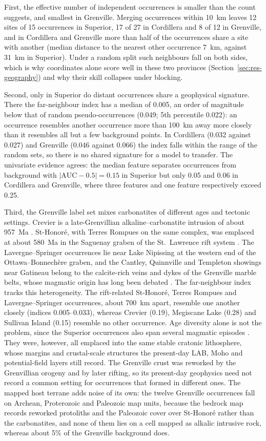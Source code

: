 \documentclass[pdflatex,sn-apa]{sn-jnl}
\begin{document}
First, the effective number of independent occurrences is smaller than the count suggests, and smallest in Grenville. Merging occurrences within 10~km leaves 12 sites of 15 occurrences in Superior, 17 of 27 in Cordillera and 8 of 12 in Grenville, and in Cordillera and Grenville more than half of the occurrences share a site with another (median distance to the nearest other occurrence 7~km, against 31~km in Superior). Under a random split such neighbours fall on both sides, which is why coordinates alone score well in these two provinces (Section~\ref{sec:res-geography}) and why their skill collapses under blocking.

Second, only in Superior do distant occurrences share a geophysical signature. There the far-neighbour index has a median of 0.005, an order of magnitude below that of random pseudo-occurrences (0.049; 5th percentile 0.022): an occurrence resembles another occurrence more than 100~km away more closely than it resembles all but a few background points. In Cordillera (0.032 against 0.027) and Grenville (0.046 against 0.066) the index falls within the range of the random sets, so there is no shared signature for a model to transfer. The univariate evidence agrees: the median feature separates occurrences from background with $|\mathrm{AUC}-0.5| = 0.15$ in Superior but only 0.05 and 0.06 in Cordillera and Grenville, where three features and one feature respectively exceed 0.25.

Third, the Grenville label set mixes carbonatites of different ages and tectonic settings. Crevier is a late-Grenvillian alkaline--carbonatite intrusion of about 957~Ma \citep{Groulier2020}. St-Honoré, with Terres Rompues on the same complex, was emplaced at about 580~Ma in the Saguenay graben of the St.~Lawrence rift system \citep{Neron2018}. The Lavergne--Springer occurrences lie near Lake Nipissing at the western end of the Ottawa--Bonnech\`ere graben, and the Cantley, Quinnville and Templeton showings near Gatineau belong to the calcite-rich veins and dykes of the Grenville marble belts, whose magmatic origin has long been debated \citep{Moecher1997}. The far-neighbour index tracks this heterogeneity. The rift-related St-Honoré, Terres Rompues and Lavergne--Springer occurrences, about 700~km apart, resemble one another closely (indices 0.005--0.033), whereas Crevier (0.19), Megiscane Lake (0.28) and Sullivan Island (0.15) resemble no other occurrence. Age diversity alone is not the problem, since the Superior occurrences also span several magmatic episodes \citep{Rukhlov2010}. They were, however, all emplaced into the same stable cratonic lithosphere, whose margins and crustal-scale structures the present-day LAB, Moho and potential-field layers still record. The Grenville crust was reworked by the Grenvillian orogeny and by later rifting, so its present-day geophysics need not record a common setting for occurrences that formed in different ones. The mapped host terrane adds noise of its own: the twelve Grenville occurrences fall on Archean, Proterozoic and Paleozoic map units, because the bedrock map records reworked protoliths and the Paleozoic cover over St-Honoré rather than the carbonatites, and none of them lies on a cell mapped as alkalic intrusive rock, whereas about 5\% of the Grenville background does.
\end{document}
